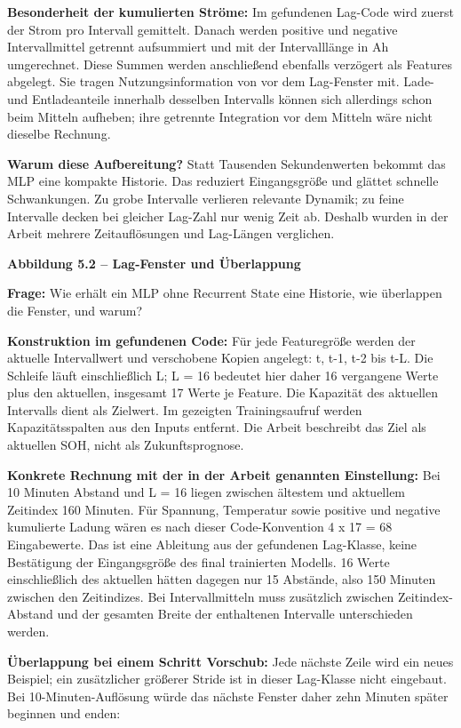 \documentclass[11pt,a4paper]{article}
\begin{document}
\textbf{Besonderheit der kumulierten Ströme:} Im gefundenen Lag-Code wird zuerst der Strom pro Intervall gemittelt. Danach werden positive und negative Intervallmittel getrennt aufsummiert und mit der Intervalllänge in Ah umgerechnet. Diese Summen werden anschließend ebenfalls verzögert als Features abgelegt. Sie tragen Nutzungsinformation von vor dem Lag-Fenster mit. Lade- und Entladeanteile innerhalb desselben Intervalls können sich allerdings schon beim Mitteln aufheben; ihre getrennte Integration vor dem Mitteln wäre nicht dieselbe Rechnung.

\textbf{Warum diese Aufbereitung?} Statt Tausenden Sekundenwerten bekommt das MLP eine kompakte Historie. Das reduziert Eingangsgröße und glättet schnelle Schwankungen. Zu grobe Intervalle verlieren relevante Dynamik; zu feine Intervalle decken bei gleicher Lag-Zahl nur wenig Zeit ab. Deshalb wurden in der Arbeit mehrere Zeitauflösungen und Lag-Längen verglichen.

\clearpage
{\large\bfseries\color{accent}Abbildung 5.2 -- Lag-Fenster und Überlappung}\par
\textbf{Frage:} Wie erhält ein MLP ohne Recurrent State eine Historie, wie überlappen die Fenster, und warum?

\textbf{Konstruktion im gefundenen Code:} Für jede Featuregröße werden der aktuelle Intervallwert und verschobene Kopien angelegt: t, t-1, t-2 bis t-L. Die Schleife läuft einschließlich L; L = 16 bedeutet hier daher 16 vergangene Werte plus den aktuellen, insgesamt 17 Werte je Feature. Die Kapazität des aktuellen Intervalls dient als Zielwert. Im gezeigten Trainingsaufruf werden Kapazitätsspalten aus den Inputs entfernt. Die Arbeit beschreibt das Ziel als aktuellen SOH, nicht als Zukunftsprognose.

\textbf{Konkrete Rechnung mit der in der Arbeit genannten Einstellung:} Bei 10 Minuten Abstand und L = 16 liegen zwischen ältestem und aktuellem Zeitindex 160 Minuten. Für Spannung, Temperatur sowie positive und negative kumulierte Ladung wären es nach dieser Code-Konvention 4 x 17 = 68 Eingabewerte. Das ist eine Ableitung aus der gefundenen Lag-Klasse, keine Bestätigung der Eingangsgröße des final trainierten Modells. 16 Werte einschließlich des aktuellen hätten dagegen nur 15 Abstände, also 150 Minuten zwischen den Zeitindizes. Bei Intervallmitteln muss zusätzlich zwischen Zeitindex-Abstand und der gesamten Breite der enthaltenen Intervalle unterschieden werden.

\textbf{Überlappung bei einem Schritt Vorschub:} Jede nächste Zeile wird ein neues Beispiel; ein zusätzlicher größerer Stride ist in dieser Lag-Klasse nicht eingebaut. Bei 10-Minuten-Auflösung würde das nächste Fenster daher zehn Minuten später beginnen und enden:
\end{document}
